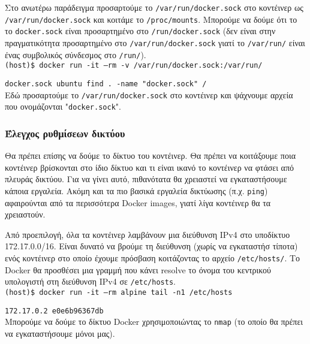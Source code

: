 Στο ανωτέρω παράδειγμα προσαρτούμε το \texttt{\textlatin{/var/run/docker.sock}}
στο κοντέινερ ως \texttt{\textlatin{/var/run/docker.sock}} και κοιτάμε το
\texttt{\textlatin{/proc/mounts}}. Μπορούμε να δούμε ότι το το
\texttt{\textlatin{docker.sock}} είναι προσαρτημένο στο
\texttt{\textlatin{/run/docker.sock}} (δεν είναι στην πραγματικότητα
προσαρτημένο στο \texttt{\textlatin{/var/run/docker.sock}} γιατί το
\texttt{\textlatin{/var/run/}} είναι ένας συμβολικός σύνδεσμος στο
\texttt{\textlatin{/run/}}). \\

\texttt{\textlatin{(host)\$ docker run -it --rm -v /var/run/docker.sock:/var/run/}}

\texttt{\textlatin{docker.sock ubuntu find . -name "docker.sock" /}} \\

Εδώ προσαρτούμε το \texttt{\textlatin{/var/run/docker.sock}} στο κοντέινερ και
ψάχνουμε αρχεία που ονομάζονται "\texttt{\textlatin{docker.sock}}".

\subsubsection{Έλεγχος ρυθμίσεων δικτύου}

Θα πρέπει επίσης να δούμε το δίκτυο του κοντέινερ. Θα πρέπει να κοιτάξουμε
ποια κοντέινερ βρίσκονται στο ίδιο δίκτυο και τι είναι ικανό το κοντέινερ
να φτάσει από πλευράς δικτύου. Για να γίνει αυτό, πιθανότατα θα χρειαστεί να
εγκαταστήσουμε κάποια εργαλεία. Ακόμη και τα πιο βασικά εργαλεία δικτύωσης
(π.χ. \texttt{\textlatin{ping}}) αφαιρούνται από τα περισσότερα
\textlatin{Docker images}, γιατί λίγα κοντέινερ θα τα χρειαστούν.


Από προεπιλογή, όλα τα κοντέινερ λαμβάνουν μια διεύθυνση \textlatin{IPv4} στο
υποδίκτυο 172.17.0.0/16. Είναι δυνατό να βρούμε τη διεύθυνση (χωρίς να
εγκαταστήσ τίποτα) ενός κοντέινερ στο οποίο έχουμε πρόσβαση κοιτάζοντας το
αρχείο \texttt{\textlatin{/etc/hosts/}}. Το \textlatin{Docker} θα προσθέσει μια
γραμμή που κάνει \textlatin{resolve} το όνομα του κεντρικού υπολογιστή στη
διεύθυνση \textlatin{IPv4} σε \texttt{\textlatin{/etc/hosts}}. \\

\texttt{\textlatin{(host)\$ docker run -it --rm alpine tail -n1 /etc/hosts}}

\texttt{\textlatin{172.17.0.2 e0e6b96367db}} \\

Μπορούμε να δούμε το δίκτυο \textlatin{Docker} χρησιμοποιώντας το
\texttt{\textlatin{nmap}} (το οποίο θα πρέπει να εγκαταστήσουμε μόνοι μας). \\

